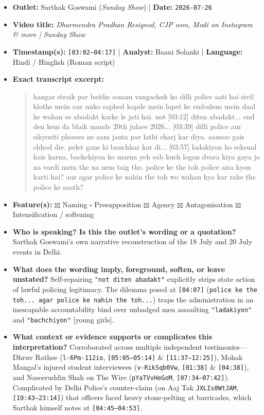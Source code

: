 \documentclass[10pt,a4paper]{article}
\begin{document}
\begin{itemize}[leftmargin=1.5em, itemsep=3pt, topsep=4pt]
  \item \textbf{Outlet:} Sarthak Goswami (\textit{Sunday Show}) | \textbf{Date:} \texttt{2026-07-26}
  \item \textbf{Video title:} \textit{Dharmendra Pradhan Resigned, CJP won, Modi on Instagram \& more | Sunday Show}
  \item \textbf{Timestamp(s):} \texttt{[03:02--04:17]} | \textbf{Analyst:} Baani Solanki | \textbf{Language:} Hindi / Hinglish (Roman script)
  \item \textbf{Exact transcript excerpt:}
    \begin{quote}\small\ttfamily [03:02] hangar straik par baithe sonam vangachuk ko dilli police aati hai sivil kloths mein aur unko saphed kapde mein lapet ke embulens mein daal ke wahan se abadakt karke le jati hai. not [03:12] diten abadakt... end den kem da blaik mande 20th julaee 2026... [03:39] dilli police aur sikyoriti phorses ne aam janta par lathi charj kar diya. aansoo gais chhod die. pelet gans ki bauchhar kar di... [03:57] ladakiyon ko seksual hais karna, bachchiyon ko marna yeh sab kuch logon dvara kiya gaya jo na vardi mein the na nem taig the. police ke the toh police aisa kyon karti hai? aur agar police ke nahin the toh wo wahan kya kar rahe the police ke saath?\end{quote}
  \item \textbf{Feature(s):} $\boxtimes$ Naming $\square$ Presupposition $\boxtimes$ Agency $\boxtimes$ Antagonisation $\boxtimes$ Intensification / softening
  \item \textbf{Who is speaking? Is this the outlet's wording or a quotation?} Sarthak Goswami's own narrative reconstruction of the 18 July and 20 July events in Delhi.
  \item \textbf{What does the wording imply, foreground, soften, or leave unstated?} Self-repairing \texttt{"not diten abadakt"} explicitly strips state action of lawful policing legitimacy. The dilemma posed at \texttt{[04:07]} (\texttt{police ke the toh... agar police ke nahin the toh...}) traps the administration in an inescapable accountability bind over unbadged men assaulting \texttt{"ladakiyon"} and \texttt{"bachchiyon"} [young girls].
  \item \textbf{What context or evidence supports or complicates this interpretation?} Corroborated across multiple independent testimonies---Dhruv Rathee (\texttt{l-6Pm-112io}, \texttt{[05:05--05:14]} \& \texttt{[11:37--12:25]}), Mohak Mangal's injured student interviewees (\texttt{v-RikSqb0Vw}, \texttt{[01:38]} \& \texttt{[04:38]}), and Naseeruddin Shah on The Wire (\texttt{pYaTVvHeGoM}, \texttt{[07:34--07:42]}). Complicated by Delhi Police's counter-claim (on Aaj Tak \texttt{JXLIs0WtJAM}, \texttt{[19:43--23:14]}) that officers faced heavy stone-pelting at barricades, which Sarthak himself notes at \texttt{[04:45--04:53]}.

\end{itemize}
\end{document}
